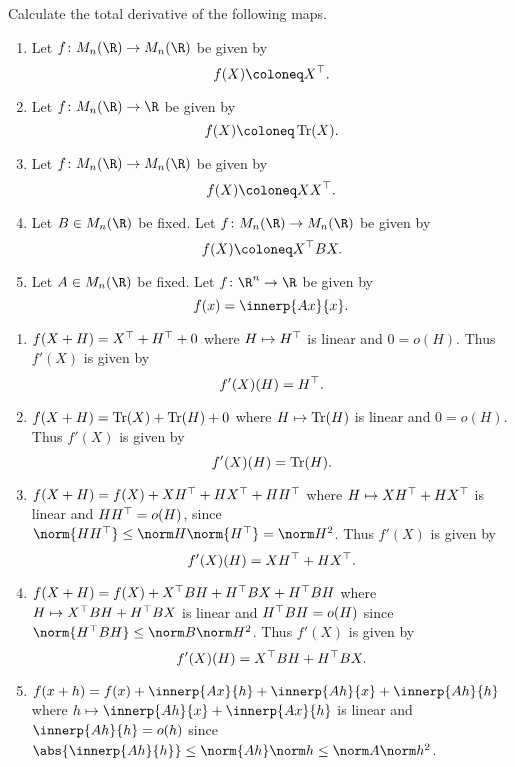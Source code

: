 \documentclass[12pt]{article}
\begin{document}
\begin{problem}
    Calculate the total derivative of the following maps.
    \begin{enumerate}
        \item Let $f\colon M_n(\R) \to M_n(\R)$ be given by \[
            f(X) \coloneq X^\T.
        \]
        \item Let $f\colon M_n(\R) \to \R$ be given by \[
            f(X) \coloneq \Tr(X).
        \]
        \item Let $f\colon M_n(\R) \to M_n(\R)$ be given by \[
            f(X) \coloneq XX^\T.
        \]
        \item Let $B \in M_n(\R)$ be fixed.
        Let $f\colon M_n(\R) \to M_n(\R)$ be given by \[
            f(X) \coloneq X^\T B X.
        \]
        \item Let $A \in M_n(\R)$ be fixed.
        Let $f\colon \R^n \to \R$ be given by \[
            f(x) = \innerp{Ax}{x}.
        \]
    \end{enumerate}
\end{problem}
\begin{solution} \leavevmode
    \begin{enumerate}
        \item $f(X + H) = X^\top + H^\top + 0$ where $H \mapsto H^\top$ is linear
        and $0 = o(H)$.
        Thus $f'(X)$ is given by \[
            f'(X)(H) = H^\top.
        \]
        \item $f(X + H) = \operatorname{Tr}(X) + \operatorname{Tr}(H) + 0$ where $H \mapsto \operatorname{Tr}(H)$ is
        linear and $0 = o(H)$.
        Thus $f'(X)$ is given by \[
            f'(X)(H) = \operatorname{Tr}(H).
        \]
        \item $f(X + H) = f(X) + XH^\top + HX^\top + HH^\top$
        where $H \mapsto XH^\top + HX^\top$ is linear and
        $HH^\top = o(H)$, since $\norm{HH^\T} \le \norm H \norm {H^\T}
        = \norm H^2$.
        Thus $f'(X)$ is given by \[
            f'(X)(H) = XH^\top + HX^\top.
        \]
        \item $f(X + H) = f(X) + X^\top BH + H^\top BX + H^\top BH$
        where $H \mapsto X^\top BH + H^\top BX$ is linear and
        $H^\top B H = o(H)$ since $\norm{H^\T B H} \le \norm B \norm H^2$.
        Thus $f'(X)$ is given by \[
            f'(X)(H) = X^\top BH + H^\top BX.
        \]
        \item
        $f(x + h) = f(x) + \innerp{Ax}{h} + \innerp{Ah}{x} + \innerp{Ah}{h}$
        where $h \mapsto \innerp{Ah}{x} + \innerp{Ax}{h}$ is linear and
        $\innerp{Ah}{h} = o(h)$ since $\abs{\innerp{Ah}{h}} \le \norm{Ah}
        \norm h \le \norm A \norm h^2$. \qedhere
    \end{enumerate}
\end{solution}
\end{document}
